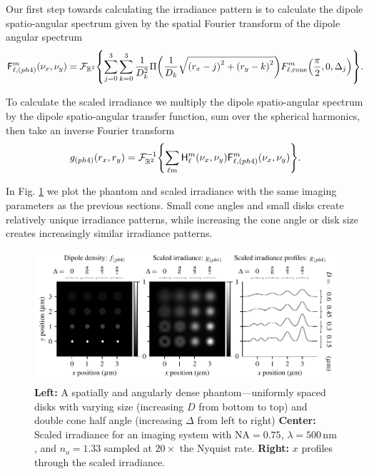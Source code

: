 \documentclass[]{osa-article}
\let\originalleft\left
\let\originalright\right
\renewcommand{\left}{\mathopen{}\mathclose\bgroup\originalleft}
\renewcommand{\right}{\aftergroup\egroup\originalright}
\providecommand{\mc}[1]{\mathcal{#1}}
\providecommand{\mbb}[1]{\mathbb{#1}}
\begin{document}
 Our first step towards calculating the irradiance pattern is to calculate the
 dipole spatio-angular spectrum given by the spatial Fourier transform of the dipole angular spectrum  
  \begin{align}
   \mathsf{F}_{\ell,(ph4)}^m(\nu_x, \nu_y) = \mc{F}_{\mbb{R}^2}\left\{\sum_{j=0}^3 \sum_{k=0}^3 \frac{1}{D_k^2}\Pi\left(\frac{1}{D_k}\sqrt{\left(r_x - j\right)^2 + \left(r_y - k\right)^2}\right)F_{\ell,\text{cone}}^m\left(\frac{\pi}{2}, 0, \Delta_j\right)\right\}.
  \end{align}
  
  To calculate the scaled irradiance we multiply the dipole spatio-angular spectrum by the dipole spatio-angular transfer function, sum over the spherical harmonics, then take an inverse Fourier transform
  \begin{align}
   g_{(ph4)}(r_x, r_y) = \mc{F}^{-1}_{\mbb{R}^2}\left\{\sum_{\ell m}\mathsf{H}_{\ell}^m(\nu_x, \nu_y)\mathsf{F}_{\ell,(ph4)}^m(\nu_x, \nu_y)\right\}.
  \end{align}

  In Fig. \ref{fig:ph4} we plot the phantom and scaled irradiance with the
  same imaging parameters as the previous sections. Small cone angles and small
  disks create relatively unique irradiance patterns, while increasing the cone
  angle or disk size creates increasingly similar irradiance patterns. 
  
  \begin{figure}[ht]
 \centering
   \centering
   \includegraphics[scale=0.8]{../figures/paratfs/ph4.pdf}
   \caption{\textbf{Left:} A spatially and angularly dense phantom---uniformly
     spaced disks with varying size (increasing $D$ from bottom to top) and
     double cone half angle (increasing $\Delta$ from left to right)
     \textbf{Center:} Scaled irradiance for an imaging system with
     $\text{NA} = 0.75$, $\lambda = 500\,\text{nm}$, and $n_o = 1.33$ sampled at
     $20\times$ the Nyquist rate. \textbf{Right:} $x$ profiles through the
     scaled irradiance.}
   \label{fig:ph4}
 \end{figure}
 
\end{document}
